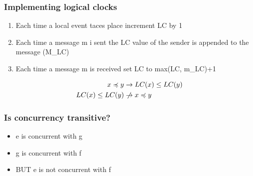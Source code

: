 \documentclass[course, english]{Notes}
\begin{document}
\subsubsection{Implementing logical clocks}
\begin{enumerate}
	\item Each time a local event taces place increment LC by 1
	\item Each time a message m i sent the LC value of the sender is
		appended to the message (M\_LC)
	\item Each time a message m is received set LC to max(LC, m\_LC)+1
\end{enumerate}

\begin{align*}
	x \preccurlyeq y &\rightarrow LC(x) \leq LC(y) \\
	LC(x) \leq LC(y) &\centernot\rightarrow x\preccurlyeq y
\end{align*}
\subsubsection{Is concurrency transitive?}
\begin{itemize}
	\item e is concurrent with g
	\item g is concurrent with f
	\item BUT e is not concurrent with f
\end{itemize}
\end{document}
